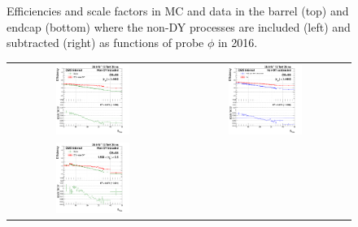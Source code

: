 \begin{figure}[htp]
\begin{center}
\begin{tabular}{cc}
    \end{tabular}
    \caption{Efficiencies and scale factors in MC and data in the barrel (top) and endcap (bottom) where the non-DY processes are included (left) and subtracted (right) as functions of probe $\phi$ in 2016.}
    \label{fig:eff_SS_nominal_phi_2016}
  \end{center}
\end{figure}

\begin{figure}[bh]
  \begin{center}
    \begin{tabular}{cc}
      \includegraphics[width=0.45\textwidth]{figures/Zprime/2016/ScaleFactor/SameSign/nominal/g_compare_cut_nVtx_Barrel_ea_ta_inc_AS_nominal_PUW.png} &
      \includegraphics[width=0.45\textwidth]{figures/Zprime/2016/ScaleFactor/SameSign/nominal/g_compare_cut_nVtx_Barrel_ea_ta_exc_AS_nominal_PUW.png} \\
      \includegraphics[width=0.45\textwidth]{figures/Zprime/2016/ScaleFactor/SameSign/nominal/g_compare_cut_nVtx_Endcap_ea_ta_inc_AS_nominal_PUW.png} &

\end{tabular}
\end{center}
\end{figure}
